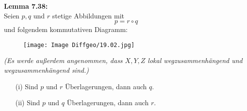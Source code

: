 \documentclass[fleqn, 12pt, letterpaper]{article}
\begin{document}
\textbf{Lemma 7.38:} \\
Seien \( p, q \) und \( r \) stetige Abbildungen mit
\[
p = r \circ q
\]
und folgendem kommutativen Diagramm:
  \begin{figure}[H]
    \centering
    \texttt{[image: Image Diffgeo/19.02.jpg]}
 \end{figure}

\emph{(Es werde außerdem angenommen, dass \( X, Y, Z \) lokal wegzusammenhängend und wegzusammenhängend sind.)}

\begin{enumerate}
    \item[(i)] Sind \( p \) und \( r \) Überlagerungen, dann auch \( q \).
    \item[(ii)] Sind \( p \) und \( q \) Überlagerungen, dann auch \( r \).
\end{enumerate}
\end{document}
